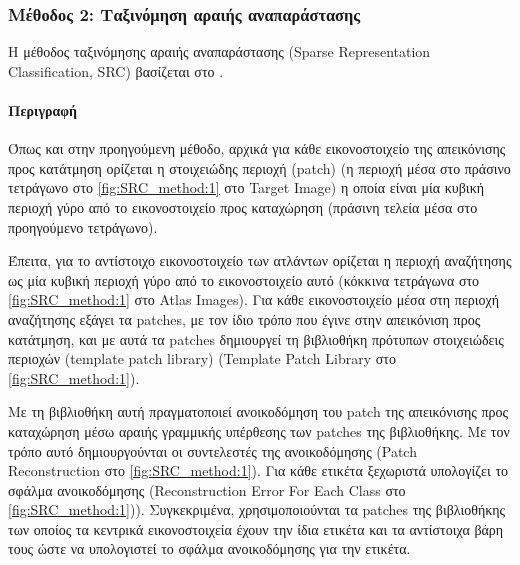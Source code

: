 \documentclass[a4paper,12pt]{article}
\newcommand{\paragraphLine}[1]{\paragraph{#1}\mbox{}}
\begin{document}
\subsubsection{Μέθοδος 2: Ταξινόμηση αραιής αναπαράστασης} \label{SRC:1}

Η μέθοδος ταξινόμησης αραιής αναπαράστασης (Sparse Representation
Classification, SRC) βασίζεται στο \cite{Tong:1}.

\paragraphLine{Περιγραφή}

Όπως και στην προηγούμενη μέθοδο, αρχικά για κάθε εικονοστοιχείο της απεικόνισης
προς κατάτμηση ορίζεται η στοιχειώδης περιοχή (patch) (η περιοχή μέσα στο
πράσινο τετράγωνο στο \autoref{fig:SRC_method:1} στο Target Image) η οποία
είναι μία κυβική περιοχή γύρο από το εικονοστοιχείο προς καταχώρηση (πράσινη
τελεία μέσα στο προηγούμενο τετράγωνο).

Έπειτα, για το αντίστοιχο εικονοστοιχείο των ατλάντων ορίζεται η περιοχή
αναζήτησης ως μία κυβική περιοχή γύρο από το εικονοστοιχείο αυτό (κόκκινα
τετράγωνα στο \autoref{fig:SRC_method:1} στο Atlas Images). Για κάθε
εικονοστοιχείο μέσα στη περιοχή αναζήτησης εξάγει τα patches, με τον ίδιο τρόπο
που έγινε στην απεικόνιση προς κατάτμηση, και με αυτά τα patches δημιουργεί τη
βιβλιοθήκη πρότυπων στοιχειώδεις περιοχών (template patch library) (Template
Patch Library στο \autoref{fig:SRC_method:1}).

Με τη βιβλιοθήκη αυτή πραγματοποιεί ανοικοδόμηση του patch της απεικόνισης προς
καταχώρηση μέσω αραιής γραμμικής υπέρθεσης των patches της βιβλιοθήκης. Με τον
τρόπο αυτό δημιουργούνται οι συντελεστές της ανοικοδόμησης (Patch Reconstruction
στο \autoref{fig:SRC_method:1}). Για κάθε ετικέτα ξεχωριστά υπολογίζει το
σφάλμα ανοικοδόμησης (Reconstruction Error For Each Class στο
\autoref{fig:SRC_method:1})). Συγκεκριμένα, χρησιμοποιούνται τα patches της
βιβλιοθήκης των οποίος τα κεντρικά εικονοστοιχεία έχουν την ίδια ετικέτα και τα
αντίστοιχα βάρη τους ώστε να υπολογιστεί το σφάλμα ανοικοδόμησης για την
ετικέτα.
\end{document}
